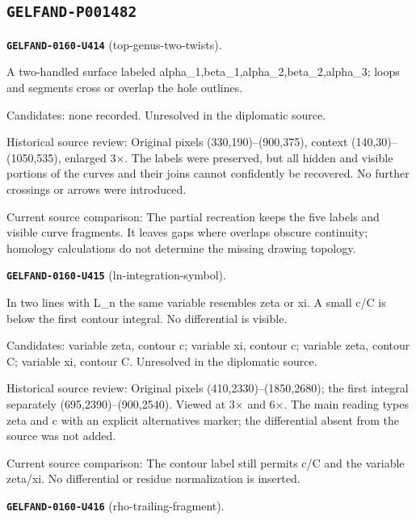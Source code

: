 \subsection*{\texttt{GELFAND-P001482}}
\par\noindent\leavevmode{}\label{GELFAND-0160-U414}\label{GELFAND-P001482:top-genus-two-twists}\textbf{\texttt{GELFAND-0160-U414}} (top-genus-two-twists).\nopagebreak[4]\par
A two-handled surface labeled alpha\_1,beta\_1,alpha\_2,beta\_2,alpha\_3; loops and segments cross or overlap the hole outlines.\par
Candidates: none recorded. Unresolved in the diplomatic source.\par
Historical source review: Original pixels (330,190)–(900,375), context (140,30)–(1050,535), enlarged 3×. The labels were preserved, but all hidden and visible portions of the curves and their joins cannot confidently be recovered. No further crossings or arrows were introduced.\par
Current source comparison: The partial recreation keeps the five labels and visible curve fragments. It leaves gaps where overlaps obscure continuity; homology calculations do not determine the missing drawing topology.\par\medskip
\par\noindent\leavevmode{}\label{GELFAND-0160-U415}\label{GELFAND-P001482:ln-integration-symbol}\textbf{\texttt{GELFAND-0160-U415}} (ln-integration-symbol).\nopagebreak[4]\par
In two lines with L\_n the same variable resembles zeta or xi. A small c/C is below the first contour integral. No differential is visible.\par
Candidates: variable zeta, contour c; variable xi, contour c; variable zeta, contour C; variable xi, contour C. Unresolved in the diplomatic source.\par
Historical source review: Original pixels (410,2330)–(1850,2680); the first integral separately (695,2390)–(900,2540). Viewed at 3× and 6×. The main reading types zeta and c with an explicit alternatives marker; the differential absent from the source was not added.\par
Current source comparison: The contour label still permits c/C and the variable zeta/xi. No differential or residue normalization is inserted.\par\medskip
\par\noindent\leavevmode{}\label{GELFAND-0160-U416}\label{GELFAND-P001482:rho-trailing-fragment}\textbf{\texttt{GELFAND-0160-U416}} (rho-trailing-fragment).\nopagebreak[4]\par
